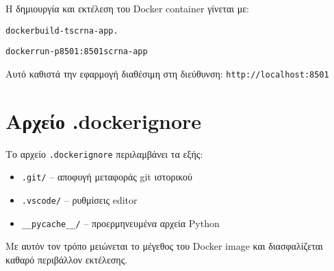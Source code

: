 Η δημιουργία και εκτέλεση του \foreignlanguage{english}{Docker container} γίνεται με:

\begin{center}
\begin{alltt}
docker build -t scrna-app .

docker run -p 8501:8501 scrna-app
\end{alltt}
\end{center}

Αυτό καθιστά την εφαρμογή διαθέσιμη στη διεύθυνση: \foreignlanguage{english}{\texttt{http://localhost:8501}}

\section*{Αρχείο \foreignlanguage{english}{.dockerignore}}

Το αρχείο \foreignlanguage{english}{\texttt{.dockerignore}} περιλαμβάνει τα εξής:

\begin{itemize}
  \item \foreignlanguage{english}{\texttt{.git/}} – αποφυγή μεταφοράς \foreignlanguage{english}{git} ιστορικού
  \item \foreignlanguage{english}{\texttt{.vscode/}} – ρυθμίσεις \foreignlanguage{english}{editor}
  \item \foreignlanguage{english}{\texttt{\_\_pycache\_\_/}} – προερμηνευμένα αρχεία \foreignlanguage{english}{Python}
\end{itemize}

Με αυτόν τον τρόπο μειώνεται το μέγεθος του \foreignlanguage{english}{Docker image} και διασφαλίζεται καθαρό περιβάλλον εκτέλεσης.
